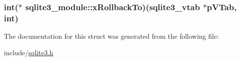 \hypertarget{structsqlite3__module_767753c6c97d1f622e5113367a0547b5}{
\subsubsection[xRollbackTo]{\setlength{\rightskip}{0pt plus 5cm}int($\ast$ {\bf sqlite3\_\-module::xRollbackTo})({\bf sqlite3\_\-vtab} $\ast$pVTab, int)}}
\label{structsqlite3__module_767753c6c97d1f622e5113367a0547b5}




The documentation for this struct was generated from the following file:\begin{CompactItemize}
\item 
include/\hyperlink{sqlite3_8h}{sqlite3.h}\end{CompactItemize}

